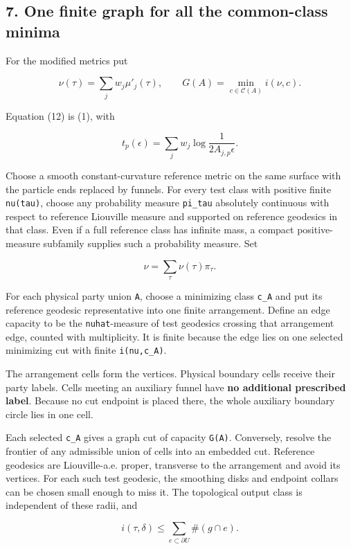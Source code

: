 \documentclass[11pt]{article}
\begin{document}
\subsection{7. One finite graph for all the common-class
minima}\label{one-finite-graph-for-all-the-common-class-minima}

For the modified metrics put

\[
\nu(\tau)=\sum_j w_j\mu'_j(\tau),
\qquad
G(A)=\min_{c\in\mathcal C(A)}i(\nu,c).
\]

Equation (12) is (1), with

\[
t_p(\epsilon)=\sum_jw_j\log\frac1{2A_{j,p}\epsilon}.
\]

Choose a smooth constant-curvature reference metric on the same surface
with the particle ends replaced by funnels. For every test class with
positive finite \texttt{nu(tau)}, choose any probability measure
\texttt{pi\_\allowbreak tau} absolutely continuous with respect to reference
Liouville measure and supported on reference geodesics in that class.
Even if a full reference class has infinite mass, a compact
positive-measure subfamily supplies such a probability measure. Set

\[
\widehat\nu=\sum_\tau\nu(\tau)\pi_\tau.
\]

For each physical party union \texttt{A}, choose a minimizing class
\texttt{c\_\allowbreak A} and put its reference geodesic representative into one
finite arrangement. Define an edge capacity to be the
\texttt{nuhat}-measure of test geodesics crossing that arrangement edge,
counted with multiplicity. It is finite because the edge lies on one
selected minimizing cut with finite \texttt{i(nu,c\_\allowbreak A)}.

The arrangement cells form the vertices. Physical boundary cells receive
their party labels. Cells meeting an auxiliary funnel have \textbf{no
additional prescribed label}. Because no cut endpoint is placed there,
the whole auxiliary boundary circle lies in one cell.

Each selected \texttt{c\_\allowbreak A} gives a graph cut of capacity \texttt{G(A)}.
Conversely, resolve the frontier of any admissible union of cells into
an embedded cut. Reference geodesics are Liouville-a.e. proper,
transverse to the arrangement and avoid its vertices. For each such test
geodesic, the smoothing disks and endpoint collars can be chosen small
enough to miss it. The topological output class is independent of these
radii, and

\[
i(\tau,\delta)\le
\sum_{e\subset\partial U}\#(g\cap e).
\]
\end{document}
